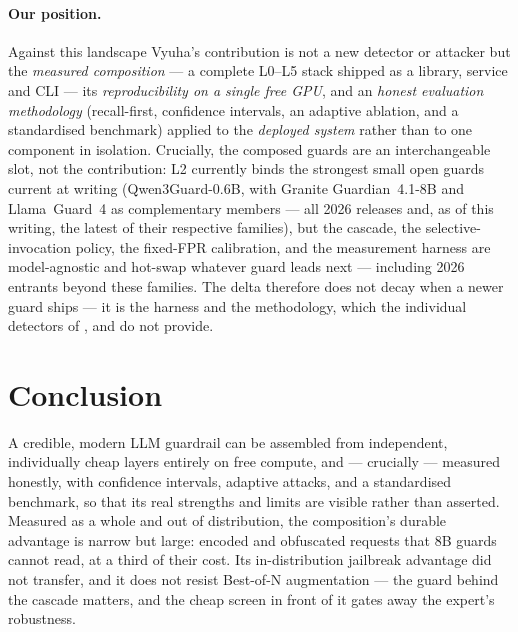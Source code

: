 \documentclass[11pt]{article}
\begin{document}
\paragraph{Our position.} Against this landscape Vyuha's contribution is not a new detector or attacker
but the \emph{measured composition} --- a complete L0--L5 stack shipped as a library, service and CLI ---
its \emph{reproducibility on a single free GPU}, and an \emph{honest evaluation methodology} (recall-first,
confidence intervals, an adaptive ablation, and a standardised benchmark) applied to the \emph{deployed
system} rather than to one component in isolation. Crucially, the composed guards are an interchangeable
slot, not the contribution: L2 currently binds the strongest small open guards current at writing
(Qwen3Guard-0.6B, with Granite Guardian~4.1-8B and Llama~Guard~4 as complementary members --- all 2026
releases and, as of this writing, the latest of their respective families), but the cascade, the
selective-invocation policy, the fixed-FPR calibration, and the measurement harness are model-agnostic
and hot-swap whatever guard leads next --- including 2026 entrants beyond these families. The delta
therefore does not decay when a newer guard ships --- it is the harness and
the methodology, which the individual detectors of \citet{promptshield}, \citet{pismith} and
\citet{haste} do not provide.

\section{Conclusion}
A credible, modern LLM guardrail can be assembled from independent, individually cheap layers entirely
on free compute, and --- crucially --- measured honestly, with confidence intervals, adaptive attacks,
and a standardised benchmark, so that its real strengths and limits are visible rather than asserted.
Measured as a whole and out of distribution, the composition's durable advantage is narrow but large:
encoded and obfuscated requests that 8B guards cannot read, at a third of their cost. Its in-distribution
jailbreak advantage did not transfer, and it does not resist Best-of-N augmentation --- the guard behind
the cascade matters, and the cheap screen in front of it gates away the expert's robustness.
\end{document}
